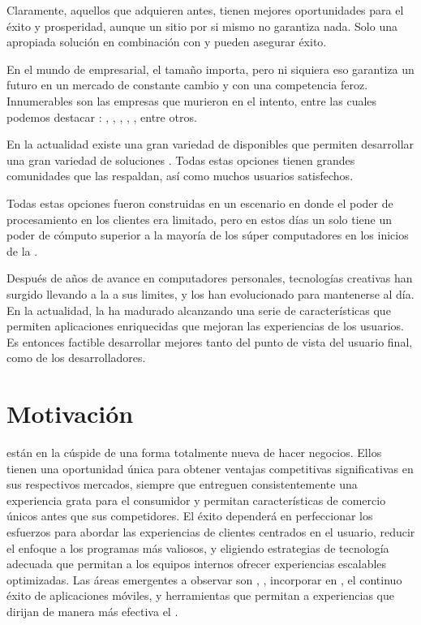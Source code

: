 Claramente, aquellos que adquieren \estores antes, tienen mejores oportunidades  para el éxito y prosperidad, aunque un sitio \ecommerce por si mismo no garantiza nada. Solo una apropiada solución \ecommerce en combinación con \emarketing y \advertising pueden asegurar éxito.


En el mundo de empresarial, el tamaño importa, pero ni siquiera eso garantiza un futuro en un mercado de constante cambio y con una competencia feroz. Innumerables son las empresas que murieron en el intento, entre las cuales podemos destacar : \sega, \kodak, \daewoo, \nokia, \blockbuster, entre otros.

En la actualidad existe una gran variedad de \frameworksPC \openSourcePC disponibles que permiten desarrollar una gran variedad de soluciones \ecommerce. Todas estas opciones tienen grandes comunidades que las respaldan, así como muchos usuarios satisfechos. 

Todas estas opciones fueron construidas en un escenario en donde el poder de procesamiento en los clientes era limitado, pero en estos días un solo \iphone tiene un poder de cómputo superior a la mayoría de los súper computadores en los inicios de la \webINT. 

Después de años de avance en computadores personales, tecnologías creativas han surgido llevando a la \webINT a sus limites, y los \webINT \browsersINT han evolucionado para mantenerse al día. En la actualidad, la \webINT ha madurado alcanzando una serie de características que permiten aplicaciones enriquecidas que mejoran las experiencias de los usuarios. Es entonces factible desarrollar \frameworksPC \ecommerce mejores tanto del punto de vista del usuario final, como de los desarrolladores. 


\section{Motivación}\label{cap:intro:motivacion}

\online \retailers están en la cúspide de una forma totalmente nueva de hacer negocios. Ellos tienen una oportunidad única para obtener ventajas competitivas significativas en sus respectivos mercados, siempre que entreguen consistentemente una experiencia grata para el consumidor y permitan características de comercio \multichannel únicos antes que sus competidores. El éxito dependerá en perfeccionar los esfuerzos para abordar las experiencias de clientes centrados en el usuario, reducir el enfoque a los programas más valiosos, y eligiendo estrategias de tecnología adecuada que permitan a los equipos internos ofrecer experiencias escalables optimizadas. Las áreas emergentes a observar son \realTimeINT, \retail \analytics, incorporar \socialnetwork en \ecommerce, el continuo éxito de aplicaciones móviles, y herramientas que permitan a \retailers \scale experiencias que dirijan de manera más efectiva el \merchandising.

